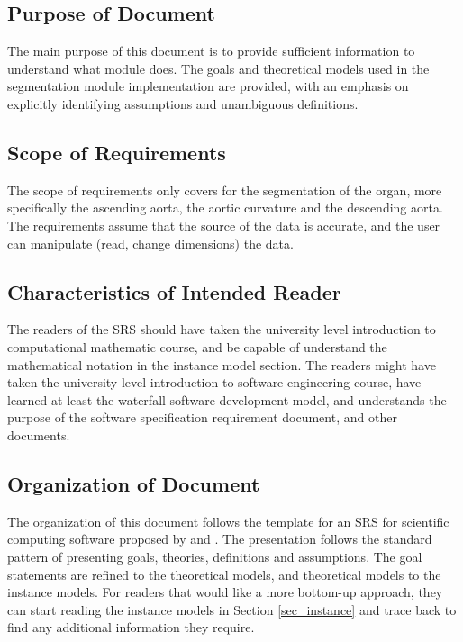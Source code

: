 \documentclass[12pt]{article}
\begin{document}
\subsection{Purpose of Document}
The main purpose of this document is to provide sufficient information to
understand what \progname{} module does. The goals and theoretical models used in the
\progname{} segmentation module implementation are provided,
with an emphasis on explicitly identifying assumptions and unambiguous
definitions.


\subsection{Scope of Requirements} 
The scope of requirements only covers for the segmentation of the organ, more specifically the ascending aorta, the aortic curvature and the descending aorta. The requirements assume that the source of the data is accurate, and the user can manipulate (read, change dimensions) the data.

\subsection{Characteristics of Intended Reader} \label{sec_IntendedReader}
The readers of the SRS should have taken the university level introduction to computational mathematic course, and be capable of understand the mathematical notation in the instance model section. The readers might have taken the university level introduction to software engineering course, have learned at least the waterfall software development model, and understands the purpose of the software specification requirement document, and other documents.

\subsection{Organization of Document}

The organization of this document follows the template for an SRS for
scientific computing software proposed by \cite{Koothoor2013} and
\cite{SmithAndLai2005}. The presentation
follows the standard pattern of presenting goals, theories, definitions and
assumptions. The goal statements are refined to the theoretical models, and
theoretical
models to the instance models. For readers that would like a more bottom-up
approach, they can start reading the instance models in Section
\ref{sec_instance} and trace back to find any additional information they
require. 
\end{document}

